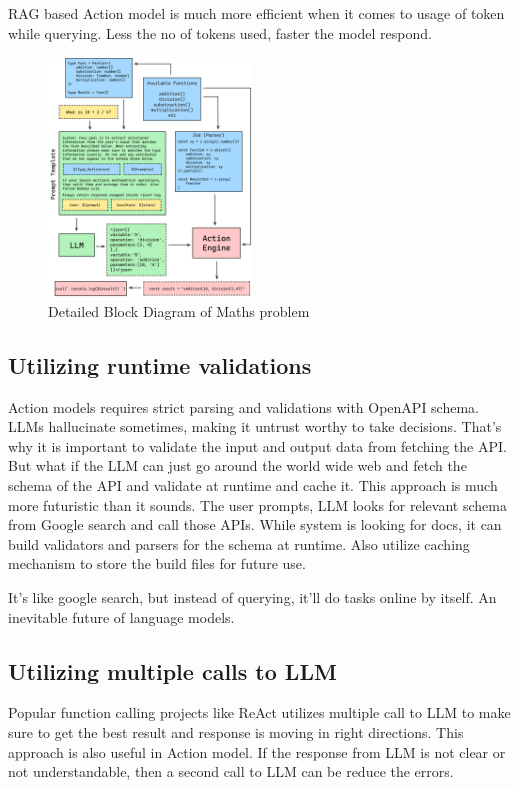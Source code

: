 \documentclass[conference]{IEEEtran}
\begin{document}
RAG based Action model is much more efficient when it comes to usage of token while querying. Less the no of tokens used, faster the model respond.

\begin{figure}[htbp]
\centering
\includegraphics[width=0.48\textwidth]{images/program.png}  
\caption{Detailed Block Diagram of Maths problem}
\label{fig}
\end{figure}


\subsection{Utilizing runtime validations}
Action models requires strict parsing and validations with OpenAPI schema. LLMs hallucinate sometimes, making it untrust worthy to take decisions. That's why it is important to validate the input and output data from fetching the API. But what if the LLM can just go around the world wide web and fetch the schema of the API and validate at runtime and cache it. This approach is much more futuristic than it sounds. The user prompts, LLM looks for relevant schema from Google search and call those APIs. While system is looking for docs, it can build validators and parsers for the schema at runtime. Also utilize caching mechanism to store the build files for future use. 

It's like google search, but instead of querying, it'll do tasks online by itself. An inevitable future of language models. 

\subsection{Utilizing multiple calls to LLM}
Popular function calling projects like ReAct utilizes multiple call to LLM to make sure to get the best result and response is moving in right directions. This approach is also useful in Action model. If the response from LLM is not clear or not understandable, then a second call to LLM can be reduce the errors.
\end{document}
